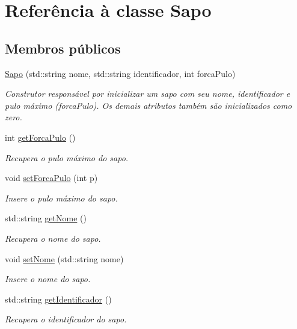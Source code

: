 \hypertarget{classSapo}{}\section{Referência à classe Sapo}
\label{classSapo}
\subsection*{Membros públicos}
\begin{DoxyCompactItemize}
\item 
\hyperlink{classSapo_a402f1c5435dd13180835b3b847e4bd7c}{Sapo} (std\+::string nome, std\+::string identificador, int forca\+Pulo)
\begin{DoxyCompactList}\small\item\em Construtor responsável por inicializar um sapo com seu nome, identificador e pulo máximo (forca\+Pulo). Os demais atributos também são inicializados como zero. \end{DoxyCompactList}\item 
int \hyperlink{classSapo_ac6225c3632a30877068c9b2bc50e6ed1}{get\+Forca\+Pulo} ()
\begin{DoxyCompactList}\small\item\em Recupera o pulo máximo do sapo. \end{DoxyCompactList}\item 
void \hyperlink{classSapo_ab43f2991360d34d24f73d4cf0e7e9ea6}{set\+Forca\+Pulo} (int p)
\begin{DoxyCompactList}\small\item\em Insere o pulo máximo do sapo. \end{DoxyCompactList}\item 
std\+::string \hyperlink{classSapo_a632ae419accb86c10fa2bf8164e648aa}{get\+Nome} ()
\begin{DoxyCompactList}\small\item\em Recupera o nome do sapo. \end{DoxyCompactList}\item 
void \hyperlink{classSapo_aacafe6399f877e9bda12c146531fe31f}{set\+Nome} (std\+::string nome)
\begin{DoxyCompactList}\small\item\em Insere o nome do sapo. \end{DoxyCompactList}\item 
std\+::string \hyperlink{classSapo_a1a9022f5e4a1f561454650b5c99baa3e}{get\+Identificador} ()
\begin{DoxyCompactList}\small\item\em Recupera o identificador do sapo. \end{DoxyCompactList}\item 

\end{DoxyCompactItemize}
